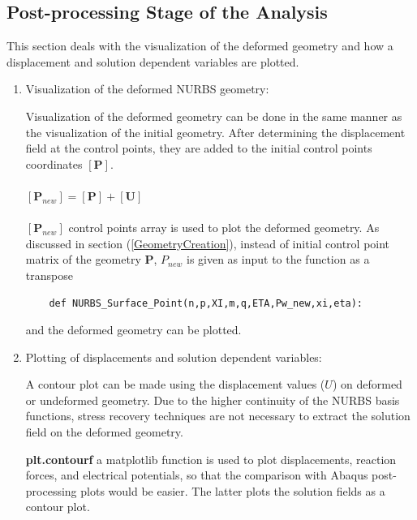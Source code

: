 \documentclass[11pt]{article}
\begin{document}
\subsection{Post-processing Stage of the Analysis}
This section deals with the visualization of the deformed geometry and how a
displacement and solution dependent variables are plotted. 

\begin{enumerate}[leftmargin=*]
	\item Visualization of the deformed NURBS geometry:	
	
	Visualization of the deformed geometry can be done in the same manner as the visualization of the initial geometry. After determining the displacement field at the control points, they are added to the initial control points coordinates
	$[\textbf{P}]$.\\
	\\
	$[\textbf{P}_{new}]=[\textbf{P}]+[\textbf{U}]$ \\
	\\
	$[\textbf{P}_{new}]$ control points array is used to plot the deformed
	geometry.
	As discussed in section (\ref{GeometryCreation}), instead of initial control point matrix of the geometry \textbf{P}, \textbf{$P_{new}$} is given as input to the function as a transpose 
	\begin{verbatim}
	def NURBS_Surface_Point(n,p,XI,m,q,ETA,Pw_new,xi,eta):
	\end{verbatim}
	and the deformed geometry can be plotted.
	 
	
	\item Plotting of displacements and solution dependent variables:
	
	A contour plot can be made using the displacement values ($U$) on deformed or undeformed geometry.
	Due to the higher continuity of the NURBS basis functions, stress recovery techniques are not necessary to extract the solution field on the deformed geometry.  
	
	\textbf{plt.contourf} a matplotlib function is used to plot displacements, reaction forces, and electrical potentials, so that the comparison with Abaqus post-processing plots would be easier. The latter plots the solution fields as a contour plot.
	
\end{enumerate}
\end{document}

